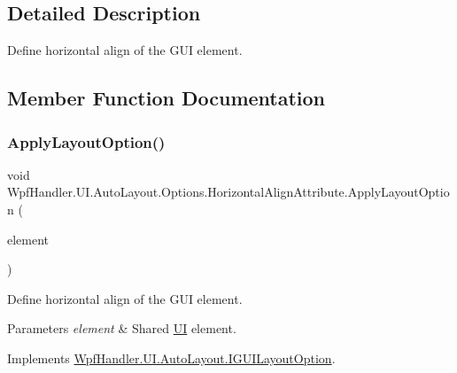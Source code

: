 \subsection{Detailed Description}
Define horizontal align of the G\+UI element. 



\subsection{Member Function Documentation}
\mbox{\label{class_wpf_handler_1_1_u_i_1_1_auto_layout_1_1_options_1_1_horizontal_align_attribute_a53335e3d47b8509f6ce67ad93044a760}} 
\subsubsection{\texorpdfstring{Apply\+Layout\+Option()}{ApplyLayoutOption()}}
{\footnotesize\ttfamily void Wpf\+Handler.\+U\+I.\+Auto\+Layout.\+Options.\+Horizontal\+Align\+Attribute.\+Apply\+Layout\+Option (\begin{DoxyParamCaption}\item[{Framework\+Element}]{element }\end{DoxyParamCaption})}



Define horizontal align of the G\+UI element. 


\begin{DoxyParams}{Parameters}
{\em element} & Shared \mbox{\hyperlink{namespace_wpf_handler_1_1_u_i}{UI}} element.\\
\hline
\end{DoxyParams}


Implements \mbox{\hyperlink{interface_wpf_handler_1_1_u_i_1_1_auto_layout_1_1_i_g_u_i_layout_option_ac2d2fa8aeaf753b3248381399f991005}{Wpf\+Handler.\+U\+I.\+Auto\+Layout.\+I\+G\+U\+I\+Layout\+Option}}.



